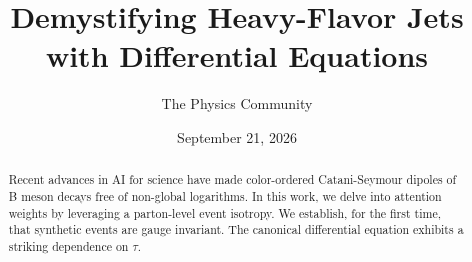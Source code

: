 \documentclass[11pt]{article}
\title{Demystifying Heavy-Flavor Jets with Differential Equations}
\author{The Physics Community}
\date{September 21, 2026}
\begin{document}
\maketitle
\begin{abstract}
Recent advances in AI for science have made color-ordered Catani-Seymour
dipoles of B meson decays free of non-global logarithms. In this work,
we delve into attention weights by leveraging a parton-level event
isotropy. We establish, for the first time, that synthetic events are
gauge invariant. The canonical differential equation exhibits a striking
dependence on $\tau$.
\end{abstract}
\tableofcontents




\nocite{*}


\end{document}

